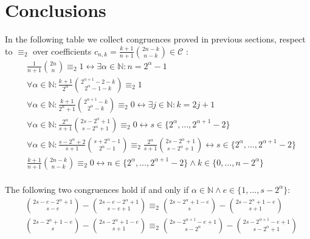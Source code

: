 
\section{Conclusions}
\label{sec:conclusions}

In the following table we collect congruences proved in previous sections, 
respect to $\equiv_{2}$ over coefficients $c_{n,k}=\frac{k+1}{n+1}{{2n-k}\choose{n-k}}\in\mathcal{C}$ :
\begin{displaymath}
    \begin{split}
        & \frac{1}{n+1}{{2n}\choose{n}} \equiv_{2} 1 \leftrightarrow \exists \alpha\in\mathbb{N}: n=2^{\alpha}-1  \\
        & \forall\alpha\in\mathbb{N}:\frac{k+1}{2^{\alpha}}{{2^{\alpha+1}-2-k}\choose{2^{\alpha}-1-k}} \equiv_{2} 1  \\
        & \forall\alpha\in\mathbb{N}:\frac{k+1}{2^{\alpha}+1}{{2^{\alpha+1}-k}\choose{2^{\alpha}-k}} \equiv_{2} 0 \leftrightarrow \exists j\in\mathbb{N}: k=2j+1   \\
        & \forall\alpha\in\mathbb{N}:\frac{2^{\alpha}}{s+1}{{2s-2^{\alpha}+1}\choose{s-2^{\alpha}+1}} \equiv_{2} 0 \leftrightarrow 
            s\in\lbrace 2^{\alpha}, \ldots, 2^{\alpha+1}-2\rbrace  \\
        & \forall\alpha\in\mathbb{N}:\frac{s-2^{\alpha}+2}{s+1}{{s+2^{\alpha}-1}\choose{2^{\alpha}-1}} \equiv_{2}
            \frac{2^{\alpha}}{s+1}{{2s-2^{\alpha}+1}\choose{s-2^{\alpha}+1}} \leftrightarrow 
                s\in\lbrace 2^{\alpha}, \ldots, 2^{\alpha+1}-2\rbrace  \\
        & \frac{k+1}{n+1}{{2n-k}\choose{n-k}} \equiv_{2} 0 \leftrightarrow 
            n \in\lbrace 2^{\alpha}, \ldots, 2^{\alpha+1} - 2\rbrace \wedge k \in \lbrace 0, \ldots, n - 2^{\alpha}\rbrace \\
    \end{split}
\end{displaymath}

The following two congruences hold if and only if $\alpha\in\mathbb{N} \wedge e\in\lbrace1,\ldots,s-2^{{\alpha}}\rbrace$:
\begin{displaymath}
    \begin{split}
        & {{2s-e-2^{{\alpha}}+1}\choose{s-e}} - {{2s-e-2^{{\alpha}}+1}\choose{s-e+1}} \equiv_{2}
            {{2s-2^{{\alpha}}+1-e}\choose{s}} - {{2s-2^{{\alpha}}+1-e}\choose{s+1}}\\
        & {{2s-2^{{\alpha}}+1-e}\choose{s}} - {{2s-2^{{\alpha}}+1-e}\choose{s+1}} \equiv_{2}
            {{2s-2^{{\alpha}+1}-e+1}\choose{s-2^{{\alpha}}}} - {{2s-2^{{\alpha}+1}-e+1}\choose{s-2^{{\alpha}}+1}}\\
    \end{split}
\end{displaymath}

